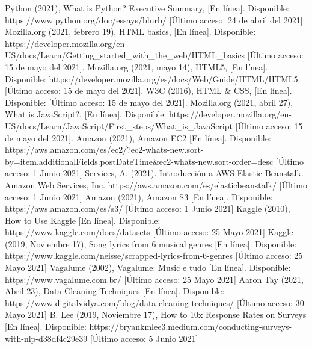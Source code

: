 \documentclass[12pt, a4paper, titlepage]{article}
\begin{document}
		\begin{thebibliography}{20}
			Python (2021), What is Python? Executive Summary, [En línea]. Disponible: https://www.python.org/doc/essays/blurb/ [Último acceso: 24 de abril del 2021].
			Mozilla.org (2021, febrero 19), HTML basics, [En línea]. Disponible: https://developer.mozilla.org/en-US/docs/Learn/Getting\_started\_with\_the\_web/HTML\_basics [Último acceso: 15 de mayo del 2021].
			Mozilla.org (2021, mayo 14), HTML5, [En línea]. Disponible: https://developer.mozilla.org/es/docs/Web/Guide/HTML/HTML5 [Último acceso: 15 de mayo del 2021].
			W3C (2016), HTML \& CSS, [En línea]. Disponible: [Último acceso: 15 de mayo del 2021].		
			Mozilla.org (2021, abril 27), What is JavaScript?, [En línea]. Disponible: https://developer.mozilla.org/en-US/docs/Learn/JavaScript/First\_steps/What\_is\_JavaScript [Último acceso: 15 de mayo del 2021].
			Amazon (2021), Amazon EC2 [En línea]. Disponible: https://aws.amazon.com/es/ec2/?ec2-whats-new.sort-by=item.additionalFields.postDateTime\&ec2-whats-new.sort-order=desc [Último acceso: 1 Junio 2021]
			Services, A. (2021). Introducción a AWS Elastic Beanstalk. Amazon Web Services, Inc. https://aws.amazon.com/es/elasticbeanstalk/ [Último acceso: 1 Junio 2021]
			Amazon (2021), Amazon S3 [En línea]. Disponible: https://aws.amazon.com/es/s3/ [Último acceso: 1 Junio 2021]		
			Kaggle (2010), How to Use Kaggle [En línea]. Disponible: https://www.kaggle.com/docs/datasets [Último acceso: 25 Mayo 2021]
			Kaggle (2019, Noviembre 17), Song lyrics from 6 musical genres [En línea]. Disponible: https://www.kaggle.com/neisse/scrapped-lyrics-from-6-genres [Último acceso: 25 Mayo 2021]
			Vagalume (2002), Vagalume: Music e tudo [En línea]. Disponible: https://www.vagalume.com.br/ [Último acceso: 25 Mayo 2021]		
			Aaron Tay (2021, Abril 23), Data Cleaning Techniques [En línea]. Disponible: https://www.digitalvidya.com/blog/data-cleaning-techniques/ [Último acceso: 30 Mayo 2021]
			B. Lee (2019, Noviembre 17), How to 10x Response Rates on Surveys [En línea]. Disponible: https://bryankmlee3.medium.com/conducting-surveys-with-nlp-d38df4c29e39 [Último acceso: 5 Junio 2021]
			
		\end{thebibliography}	
	
\end{document}
